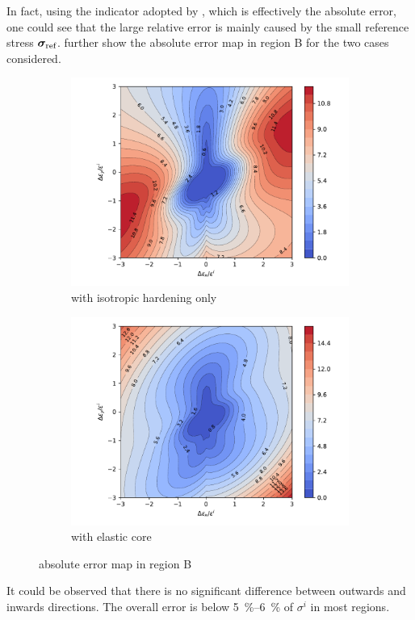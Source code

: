In fact, using the indicator adopted by \citet{Anjiki2019}, which is effectively the absolute error, one could see that the large relative error is mainly caused by the small reference stress $\bm{\sigma}_\text{ref}$.
 further show the absolute error map in region B for the two cases considered.
\begin{figure}[htb]
    \centering
    \begin{subfigure}{.48\textwidth}\centering
        \includegraphics[width=.99\textwidth]{PIC/ISOMAP/abs.error.iso.uniaxial.pdf}
        \caption{with isotropic hardening only}\label{fig:abs_error_euler_with_iso}
    \end{subfigure}\hfill
    \begin{subfigure}{.48\textwidth}\centering
        \includegraphics[width=.99\textwidth]{PIC/ISOMAP/abs.error.core.uniaxial.pdf}
        \caption{with elastic core}\label{fig:abs_error_euler_with_core}
    \end{subfigure}
    \caption{absolute error map in region B}\label{fig:abs_error}
\end{figure}
It could be observed that there is no significant difference between outwards and inwards directions.
The overall error is below \SIrange{5}{6}{\percent} of $\sigma^i$ in most regions.

